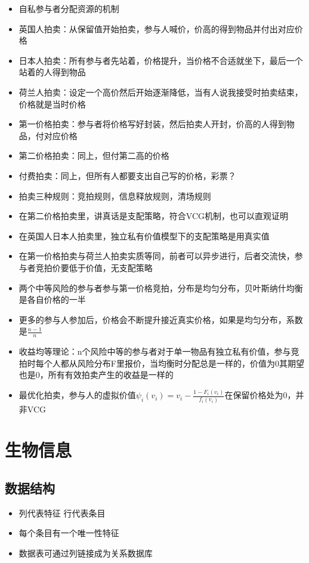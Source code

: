 \documentclass[]{book}
\providecommand{\tightlist}{%
  \setlength{\itemsep}{0pt}\setlength{\parskip}{0pt}}
\begin{document}
\begin{itemize}
\tightlist
\item
  自私参与者分配资源的机制
\item
  英国人拍卖：从保留值开始拍卖，参与人喊价，价高的得到物品并付出对应价格
\item
  日本人拍卖：所有参与者先站着，价格提升，当价格不合适就坐下，最后一个站着的人得到物品
\item
  荷兰人拍卖：设定一个高价然后开始逐渐降低，当有人说我接受时拍卖结束，价格就是当时价格
\item
  第一价格拍卖：参与者将价格写好封装，然后拍卖人开封，价高的人得到物品，付对应价格
\item
  第二价格拍卖：同上，但付第二高的价格
\item
  付费拍卖：同上，但所有人都要支出自己写的价格，彩票？
\item
  拍卖三种规则：竞拍规则，信息释放规则，清场规则
\item
  在第二价格拍卖里，讲真话是支配策略，符合VCG机制，也可以直观证明
\item
  在英国人日本人拍卖里，独立私有价值模型下的支配策略是用真实值
\item
  在第一价格拍卖与荷兰人拍卖实质等同，前者可以异步进行，后者交流快，参与者竞拍价要低于价值，无支配策略
\item
  两个中等风险的参与者参与第一价格竞拍，分布是均匀分布，贝叶斯纳什均衡是各自价格的一半
\item
  更多的参与人参加后，价格会不断提升接近真实价格，如果是均匀分布，系数是\(\frac{n-1}{n}\)
\item
  收益均等理论：n个风险中等的参与者对于单一物品有独立私有价值，参与竞拍时每个人都从风险分布F里报价，当均衡时分配总是一样的，价值为0其期望也是0，所有有效拍卖产生的收益是一样的
\item
  最优化拍卖，参与人的虚拟价值\(\psi_i(v_i) = v_i - \frac{1-F_i(v_i)}{f_i(v_i)}\)在保留价格处为0，并非VCG
\end{itemize}

\hypertarget{bios}{%
\chapter{生物信息}\label{bios}}

\hypertarget{ux6570ux636eux7ed3ux6784}{%
\section{数据结构}\label{ux6570ux636eux7ed3ux6784}}

\begin{itemize}
\tightlist
\item
  列代表特征 行代表条目
\item
  每个条目有一个唯一性特征
\item
  数据表可通过列链接成为关系数据库
\end{itemize}
\end{document}
